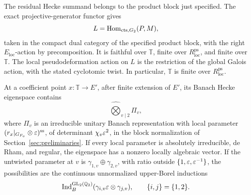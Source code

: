 \begin{proposition}\label{prop:block-comparison}
The residual Hecke summand belongs to the product block
just specified. The exact projective-generator functor gives
\[
 L=\operatorname{Hom}_{\mathrm{cts},G_2}(P,M),
\]
taken in the compact dual category of the specified product block,
with the right \(E_{\mathrm{loc}}\)-action by precomposition. It is
faithful over \(\mathbb T\), finite over
\(R_{\mathrm{loc}}^{\mathrm{ps}}\), and finite over
\(\mathbb T\). The local pseudodeformation action on \(L\)
is the restriction of the global Galois action, with the
stated cyclotomic twist. In particular,
\(\mathbb T\) is finite over \(R_{\mathrm{loc}}^{\mathrm{ps}}\).

At a coefficient point \(x:\mathbb T\to E'\), after finite
extension of \(E'\), its Banach Hecke eigenspace contains
\[
 \widehat\bigotimes_{v\mid2}\Pi_v,
\]
where \(\Pi_v\) is an irreducible unitary Banach
representation with local parameter
\((r_x|_{G_{F_v}}\otimes\varepsilon)^{\mathrm{ss}}\), of determinant
\(\chi_v\varepsilon^2\), in the block normalization of
Section~\ref{sec:preliminaries}. If every local parameter is absolutely
irreducible, de Rham, and regular, the eigenspace has a
nonzero locally algebraic vector. If the untwisted
parameter at \(v\) is
\(\gamma_{1,v}\oplus\gamma_{2,v}\), with ratio outside
\(\{1,\varepsilon,\varepsilon^{-1}\}\), the possibilities are the
continuous unnormalized upper-Borel inductions
\[
 \operatorname{Ind}_B^{\operatorname{GL}_2(\mathbb Q_2)}
       (\gamma_{i,v}\varepsilon\otimes\gamma_{j,v}),
 \qquad \{i,j\}=\{1,2\}.
\]
\end{proposition}
